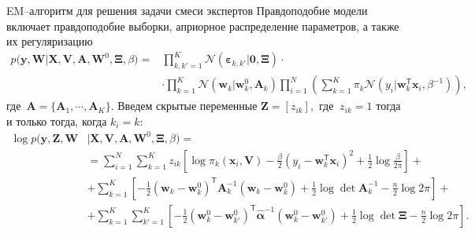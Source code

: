 \documentclass[9pt,pdf,hyperref={unicode}]{beamer}
\begin{document}
\begin{frame}{EM--алгоритм для решения задачи смеси экспертов}
\justifying
Правдоподобие модели включает правдоподобие выборки, априорное распределение параметров, а также их регуляризацию
\begin{equation*}
\begin{aligned}
p\bigr(\mathbf{y}, \mathbf{W}|\mathbf{X}, \mathbf{V}, \textbf{A}, \textbf{W}^{0}, \bm{\Xi}, \beta\bigr) = &\prod_{k,k'=1}^{K}\mathcal{N}\left(\bm{\varepsilon}_{k,k'}|\mathbf{0},  \bm{\Xi}\right)\cdot\\
&\cdot\prod_{k=1}^{K}\mathcal{N}\left(\mathbf{w}_{k}|\mathbf{w}^{0}_{k}, \mathbf{A}_{k}\right)\prod_{i=1}^{N}\left(\sum_{k=1}^{K}\pi_{k}\mathcal{N}\left(y_{i}|\mathbf{w}_{k}^{\mathsf{T}}\mathbf{x}_{i}, \beta^{-1}\right)\right),
\end{aligned}
\end{equation*}
где~$\mathbf{A} = \bigr\{\mathbf{A}_1, \cdots, \mathbf{A}_K\bigr\}.$
Введем скрытые переменные $\textbf{Z} = [z_{ik}],$ где $~z_{ik} = 1$ тогда и только тогда, когда $k_i=k$:
\begin{equation*}
\begin{aligned}
\log p\bigr(\mathbf{y}, \mathbf{Z}, \mathbf{W}&|\mathbf{X}, \mathbf{V}, \textbf{A}, \textbf{W}^{0},  \bm{\Xi}, \beta\bigr) =\\
&= \sum_{i=1}^{N}\sum_{k=1}^{K}z_{ik}\left[\log\pi_k\left(\textbf{x}_i, \textbf{V}\right) - \frac{\beta}{2}\left(y_{i} - \textbf{w}_{k}^{\mathsf{T}}\textbf{x}_{i}\right)^{2} + \frac{1}{2}\log\frac{\beta}{2\pi}\right] +\\
&+ \sum_{k=1}^{K}\left[-\frac{1}{2}\left(\textbf{w}_{k} - \textbf{w}_{k}^{0}\right)^{\mathsf{T}}\textbf{A}_{k}^{-1}\left(\textbf{w}_{k} - \textbf{w}_{k}^{0}\right) + \frac{1}{2}\log\det\textbf{A}^{-1}_{k} - \frac{n}{2}\log2\pi\right]+\\
&+ \sum_{k=1}^{K}\sum_{k'=1}^{K}\left[-\frac{1}{2}\left(\textbf{w}_{k}^{0}-\textbf{w}_{k'}^{0}\right)^{\mathsf{T}}\hat{\bm{\alpha}}^{-1}\left(\textbf{w}_{k}^{0}-\textbf{w}_{k'}^{0}\right) +\frac{1}{2}\log\det \bm{\Xi} -\frac{n}{2}\log{2\pi}\right].
\end{aligned}
\end{equation*}

\end{frame}
\end{document}
